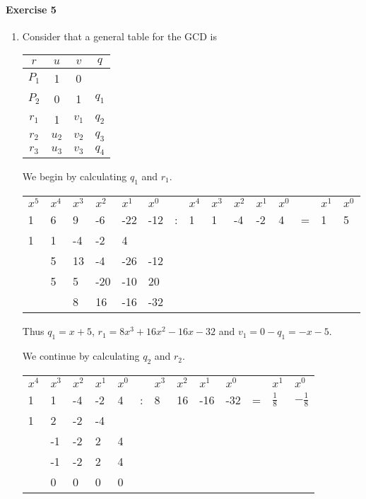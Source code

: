 \documentclass{article}
\begin{document}
\pagebreak
\paragraph{Exercise 5}

\begin{enumerate}
    \item
    Consider that a general table for the GCD is 
    \begin{center}
        \begin{tabular}{c | c c | c}
            $r$ & $u$ & $v$ & $q$ \\\midrule
            $P_1$ & 1 & 0 & \\
            $P_2$ & 0 & 1 & $q_1$ \\
            $r_1$ & 1 & $v_1$ & $q_2$ \\
            $r_2$ & $u_2$ & $v_2$ & $q_3$ \\
            $r_3$ & $u_3$ & $v_3$ & $q_4$ \\
        \end{tabular}
    \end{center}

    We begin by calculating $q_1$ and $r_1$.

    \begin{center}
        \begin{tabular}{l l l l l l l l l l l l l l l}
            $x^5$&$x^4$&$x^3$&$x^2$&$x^1$&$x^0$&&$x^4$&$x^3$&$x^2$&$x^1$&$x^0$&&$x^1$&$x^0$ \\
            1&6&9&-6&-22&-12& :& 1&1&-4&-2&4& =& 1&5 \\
            1&1&-4&-2&4&&&&&&&&& \\\cmidrule{1-5}
            &5&13&-4&-26&-12&&&&&&&&& \\
            &5&5&-20&-10&20&&&&&&&&& \\\cmidrule{2-6}
            &&8&16&-16&-32&&&&&&&&& \\
        \end{tabular}
    \end{center}

    Thus $q_1 = x + 5$, $r_1 = 8x^3 + 16x^2 - 16x - 32$ and $v_1 = 0 - q_1 = -x - 5$.

    We continue by calculating $q_2$ and $r_2$.

    \begin{center}
        \begin{tabular}{ l l l l l l l l l l l l l}
            $x^4$&$x^3$&$x^2$&$x^1$&$x^0$&&$x^3$&$x^2$&$x^1$&$x^0$&&$x^1$&$x^0$ \\
            1&1&-4&-2&4& :& 8&16&-16&-32& =& $\frac{1}{8}$&$-\frac{1}{8}$ \\
            1&2&-2&-4&&&&&&&& \\\cmidrule{1-4}
            &-1&-2&2&4&&&&&&& \\
            &-1&-2&2&4&&&&&&&& \\\cmidrule{2-5}
            &0&0&0&0&&&&&&&& \\
        \end{tabular}
    \end{center}


\end{enumerate}
\end{document}
